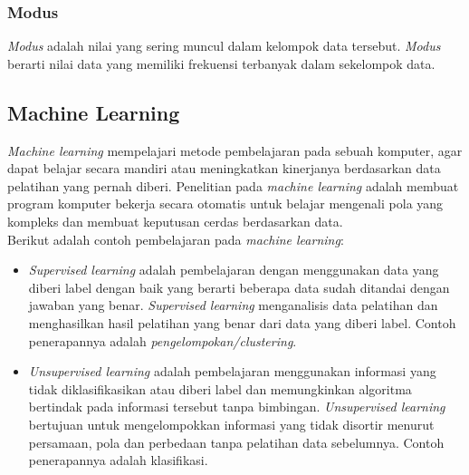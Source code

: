 \subsubsection{Modus}
\textit{Modus} adalah nilai yang sering muncul dalam kelompok data tersebut. \textit{Modus} berarti nilai data yang memiliki frekuensi terbanyak dalam sekelompok data. 


\subsection{Machine Learning} 
\textit{Machine learning} mempelajari metode pembelajaran pada sebuah komputer, agar dapat belajar secara mandiri atau meningkatkan kinerjanya berdasarkan data pelatihan yang pernah diberi. Penelitian pada \textit{machine learning} adalah membuat program komputer bekerja secara otomatis untuk belajar mengenali pola yang kompleks dan membuat keputusan cerdas berdasarkan data. \\

\noindent Berikut adalah contoh pembelajaran pada \textit{machine learning}:

\begin{itemize}

\item
\textit{Supervised learning} adalah pembelajaran dengan menggunakan data yang diberi label dengan baik yang berarti beberapa data sudah ditandai dengan jawaban yang benar. \textit{Supervised learning} menganalisis data pelatihan dan menghasilkan hasil pelatihan yang benar dari data yang diberi label. Contoh penerapannya adalah \textit{pengelompokan/clustering}.

\item
\textit{Unsupervised learning} adalah pembelajaran menggunakan informasi yang tidak diklasifikasikan atau diberi label dan memungkinkan algoritma  bertindak pada informasi tersebut tanpa bimbingan. \textit{Unsupervised learning} bertujuan untuk mengelompokkan informasi yang tidak disortir menurut persamaan, pola dan perbedaan tanpa pelatihan data sebelumnya. Contoh penerapannya adalah klasifikasi.

\end{itemize}

\newpage
